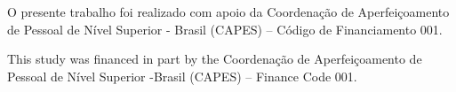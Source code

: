 \chapter*{}




\vfill
\vfill
\vfill
O presente trabalho foi realizado com apoio da Coordenação de Aperfeiçoamento de Pessoal de Nível Superior - Brasil (CAPES) -- Código de Financiamento 001.

\bigskip 

\noindent This study was financed in part by the Coordenação de Aperfeiçoamento de Pessoal de Nível Superior -Brasil (CAPES) -- Finance Code 001.
\vfill
